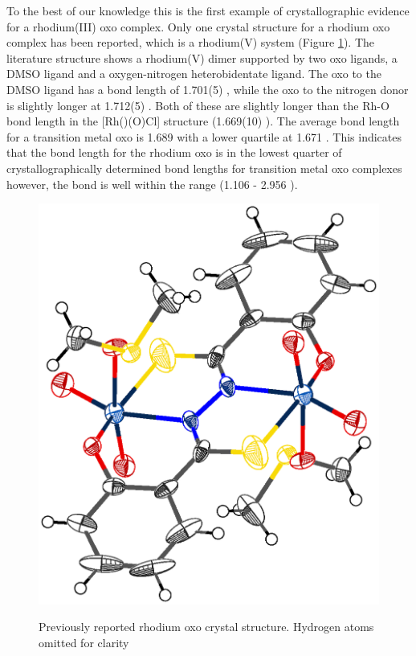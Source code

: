 To the best of our knowledge this is the first example of crystallographic evidence for a rhodium(III) oxo complex.  Only one crystal structure for a rhodium oxo complex has been reported, which is a rhodium(V) system (Figure \ref{Kaczul}).\cite{Gangopadhyay2010}  The literature structure shows a rhodium(V) dimer supported by two oxo ligands, a DMSO ligand and a oxygen-nitrogen heterobidentate ligand.  The oxo \trans{} to the DMSO ligand has a bond length of 1.701(5) \A, while the oxo \trans{} to the nitrogen donor is slightly longer at 1.712(5) \A.  Both of these are slightly longer than the Rh-O bond length in the [Rh(\tBuxantphos)(O)Cl] structure (1.669(10) \A).  The average bond length for a transition metal oxo is 1.689 \A{} with a lower quartile at 1.671 \A.  This indicates that the bond length for the rhodium oxo is in the lowest quarter of crystallographically determined bond lengths for transition metal oxo complexes however, the bond is well within the range (1.106 - 2.956 \A).  

\begin{figure}[htb]
\begin{center}
\includegraphics[scale=0.7]{../Othercrystals/KACZUL.eps}
\caption[Previously reported rhodium oxo crystal structure]{Previously reported rhodium oxo crystal structure.\cite{Gangopadhyay2010} Hydrogen atoms omitted for clarity}
\vspace{0.2cm}
\label{Kaczul}
\end{center}
\end{figure}
\vspace{0.2cm}

